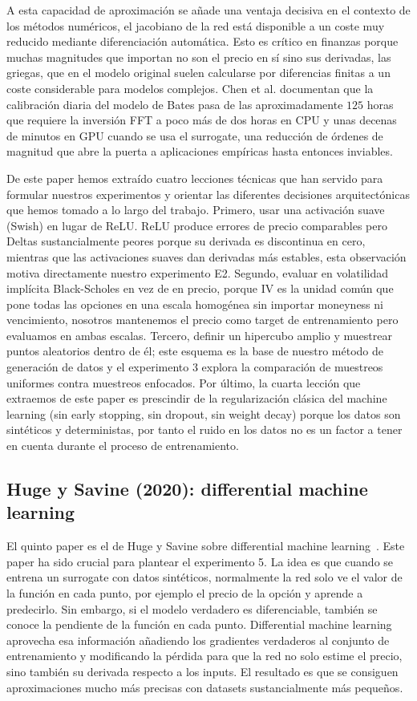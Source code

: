 \documentclass[11pt,a4paper]{article}
\begin{document}
A esta capacidad de aproximación se añade una ventaja decisiva en el contexto de los métodos numéricos, el jacobiano de la red está disponible a un coste muy reducido mediante diferenciación automática. Esto es crítico en finanzas porque muchas magnitudes que importan no son el precio en sí sino sus derivadas, las griegas, que en el modelo original suelen calcularse por diferencias finitas a un coste considerable para modelos complejos. Chen et al. documentan que la calibración diaria del modelo de Bates pasa de las aproximadamente $125$ horas que requiere la inversión FFT a poco más de dos horas en CPU y unas decenas de minutos en GPU cuando se usa el surrogate, una reducción de órdenes de magnitud que abre la puerta a aplicaciones empíricas hasta entonces inviables.


De este paper hemos extraído cuatro lecciones técnicas que han servido para formular nuestros experimentos y orientar las diferentes decisiones arquitectónicas que hemos tomado a lo largo del trabajo. Primero, usar una activación suave (Swish) en lugar de ReLU. ReLU produce errores de precio comparables pero Deltas sustancialmente peores porque su derivada es discontinua en cero, mientras que las activaciones suaves dan derivadas más estables, esta observación motiva directamente nuestro experimento E2. Segundo, evaluar en volatilidad implícita Black-Scholes en vez de en precio, porque IV es la unidad común que pone todas las opciones en una escala homogénea sin importar moneyness ni vencimiento, nosotros mantenemos el precio como target de entrenamiento pero evaluamos en ambas escalas. Tercero, definir un hipercubo amplio y muestrear puntos aleatorios dentro de él; este esquema es la base de nuestro método de generación de datos y el experimento 3 explora la comparación de muestreos uniformes contra muestreos enfocados. Por último, la cuarta lección que extraemos de este paper es prescindir de la regularización clásica del machine learning (sin early stopping, sin dropout, sin weight decay) porque los datos son sintéticos y deterministas, por tanto el ruido en los datos no es un factor a tener en cuenta durante el proceso de entrenamiento.

\subsection{Huge y Savine (2020): differential machine learning}

El quinto paper es el de Huge y Savine sobre differential machine learning~\cite{huge2020}. Este paper ha sido crucial para plantear el experimento 5. La idea es que cuando se entrena un surrogate con datos sintéticos, normalmente la red solo ve el valor de la función en cada punto, por ejemplo el precio de la opción y aprende a predecirlo. Sin embargo, si el modelo verdadero es diferenciable, también se conoce la pendiente de la función en cada punto. Differential machine learning aprovecha esa información añadiendo los gradientes verdaderos al conjunto de entrenamiento y modificando la pérdida para que la red no solo estime el precio, sino también su derivada respecto a los inputs. El resultado es que se consiguen aproximaciones mucho más precisas con datasets sustancialmente más pequeños.
\end{document}
